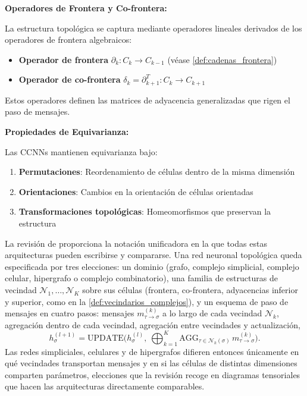 \textbf{Operadores de Frontera y Co-frontera:}

La estructura topológica se captura mediante operadores lineales derivados de los operadores de frontera algebraicos:
\begin{itemize}
    \item \textbf{Operador de frontera} $\partial_k: C_k \to C_{k-1}$ (véase \autoref{def:cadenas_frontera})
    \item \textbf{Operador de co-frontera} $\delta_k = \partial_{k+1}^T: C_k \to C_{k+1}$
\end{itemize}

Estos operadores definen las matrices de adyacencia generalizadas que rigen el paso de mensajes.

\textbf{Propiedades de Equivarianza:}

Las CCNNs mantienen equivarianza bajo:
\begin{enumerate}
    \item \textbf{Permutaciones}: Reordenamiento de células dentro de la misma dimensión
    \item \textbf{Orientaciones}: Cambios en la orientación de células orientadas
    \item \textbf{Transformaciones topológicas}: Homeomorfismos que preservan la estructura
\end{enumerate}

La revisión de \citet{papillon2023tdlarchitectures} proporciona la notación unificadora en la que todas estas arquitecturas pueden escribirse y compararse. Una red neuronal topológica queda especificada por tres elecciones: un dominio (grafo, complejo simplicial, complejo celular, hipergrafo o complejo combinatorio), una familia de estructuras de vecindad $\mathcal{N}_1, \dots, \mathcal{N}_K$ sobre sus células (frontera, co-frontera, adyacencias inferior y superior, como en la \autoref{def:vecindarios_complejos}), y un esquema de paso de mensajes en cuatro pasos: mensajes $m^{(k)}_{\tau \to \sigma}$ a lo largo de cada vecindad $\mathcal{N}_k$, agregación dentro de cada vecindad, agregación entre vecindades y actualización,
\[h_\sigma^{(l+1)} = \text{UPDATE}\Big(h_\sigma^{(l)},\ \bigoplus_{k=1}^{K} \text{AGG}_{\tau \in \mathcal{N}_k(\sigma)}\, m^{(k)}_{\tau \to \sigma}\Big).\]
Las redes simpliciales, celulares y de hipergrafos difieren entonces únicamente en qué vecindades transportan mensajes y en si las células de distintas dimensiones comparten parámetros, elecciones que la revisión recoge en diagramas tensoriales que hacen las arquitecturas directamente comparables.

